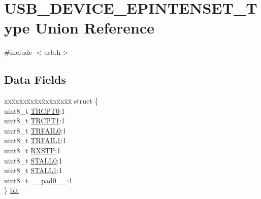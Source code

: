 \hypertarget{union_u_s_b___d_e_v_i_c_e___e_p_i_n_t_e_n_s_e_t___type}{}\section{U\+S\+B\+\_\+\+D\+E\+V\+I\+C\+E\+\_\+\+E\+P\+I\+N\+T\+E\+N\+S\+E\+T\+\_\+\+Type Union Reference}
\label{union_u_s_b___d_e_v_i_c_e___e_p_i_n_t_e_n_s_e_t___type}


{\ttfamily \#include $<$usb.\+h$>$}

\subsection*{Data Fields}
\begin{DoxyCompactItemize}
\item 
\begin{tabbing}
xx\=xx\=xx\=xx\=xx\=xx\=xx\=xx\=xx\=\kill
struct \{\\
\>uint8\_t \mbox{\hyperlink{union_u_s_b___d_e_v_i_c_e___e_p_i_n_t_e_n_s_e_t___type_a7180d96a777e3568fd150aa959df6838}{TRCPT0}}:1\\
\>uint8\_t \mbox{\hyperlink{union_u_s_b___d_e_v_i_c_e___e_p_i_n_t_e_n_s_e_t___type_abfd778fdb9c052b995d0dabc9e75081b}{TRCPT1}}:1\\
\>uint8\_t \mbox{\hyperlink{union_u_s_b___d_e_v_i_c_e___e_p_i_n_t_e_n_s_e_t___type_a3397b91aaffcb46a2422c28eadaf5be7}{TRFAIL0}}:1\\
\>uint8\_t \mbox{\hyperlink{union_u_s_b___d_e_v_i_c_e___e_p_i_n_t_e_n_s_e_t___type_a25eefecf91be8facebc4c383e2339b9b}{TRFAIL1}}:1\\
\>uint8\_t \mbox{\hyperlink{union_u_s_b___d_e_v_i_c_e___e_p_i_n_t_e_n_s_e_t___type_ad58935f35c47fca0b24443107b04a5d7}{RXSTP}}:1\\
\>uint8\_t \mbox{\hyperlink{union_u_s_b___d_e_v_i_c_e___e_p_i_n_t_e_n_s_e_t___type_afd62db615742ff440bf4aa299207317e}{STALL0}}:1\\
\>uint8\_t \mbox{\hyperlink{union_u_s_b___d_e_v_i_c_e___e_p_i_n_t_e_n_s_e_t___type_a8116f0bbd6acc75e21dc07e2734fc26c}{STALL1}}:1\\
\>uint8\_t \mbox{\hyperlink{union_u_s_b___d_e_v_i_c_e___e_p_i_n_t_e_n_s_e_t___type_a8b4eebe79ded0459acec2f4950102ba3}{\_\_pad0\_\_}}:1\\
\} \mbox{\hyperlink{union_u_s_b___d_e_v_i_c_e___e_p_i_n_t_e_n_s_e_t___type_ab70bbcd441e8bc9890a124b19fc493ee}{bit}}\\


\end{tabbing}
\end{DoxyCompactItemize}
